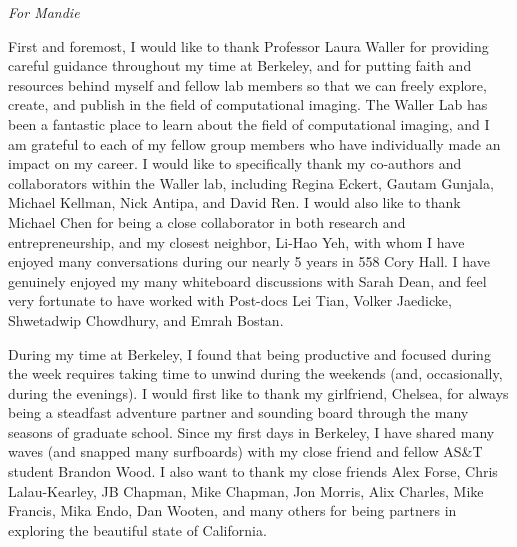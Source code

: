 \documentclass{ucbthesis}
\begin{document}
\begin{frontmatter}

\begin{dedication}
\null\vfil
\begin{center}
\textit{For Mandie}
\end{center}
\vfil\null
\end{dedication}


\tableofcontents
\clearpage
\listoffigures


\begin{acknowledgements}
First and foremost, I would like to thank Professor Laura Waller for providing careful guidance throughout my time at Berkeley, and for putting faith and resources behind myself and fellow lab members so that we can freely explore, create, and publish in the field of computational imaging. The Waller Lab has been a fantastic place to learn about the field of computational imaging, and I am grateful to each of my fellow group members who have individually made an impact on my career. I would like to specifically thank my co-authors and collaborators within the Waller lab, including Regina Eckert, Gautam Gunjala, Michael Kellman, Nick Antipa, and David Ren. I would also like to thank Michael Chen for being a close collaborator in both research and entrepreneurship, and my closest neighbor, Li-Hao Yeh, with whom I have enjoyed many conversations during our nearly 5 years in 558 Cory Hall. I have genuinely enjoyed my many whiteboard discussions with Sarah Dean, and feel very fortunate to have worked with Post-docs Lei Tian, Volker Jaedicke, Shwetadwip Chowdhury, and Emrah Bostan.

During my time at Berkeley, I found that being productive and focused during the week requires taking time to unwind during the weekends (and, occasionally, during the evenings). I would first like to thank my girlfriend, Chelsea, for always being a steadfast adventure partner and sounding board through the many seasons of graduate school. Since my first days in Berkeley, I have shared many waves (and snapped many surfboards) with my close friend and fellow AS\&T student Brandon Wood. I also want to thank my close friends Alex Forse, Chris Lalau-Kearley, JB Chapman, Mike Chapman, Jon Morris, Alix Charles, Mike Francis, Mika Endo, Dan Wooten, and many others for being partners in exploring the beautiful state of California.


\end{acknowledgements}
\end{frontmatter}
\end{document}
